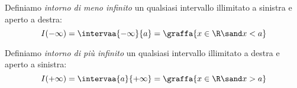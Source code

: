 
\begin{newdef}{}{}
Definiamo \emph{intorno di meno infinito} un qualsiasi intervallo illimitato 
a sinistra e aperto a destra:
\[I(-\infty) = \intervaa{-\infty}{a} = \graffa{x \in \R \sand x < a}\]
\end{newdef}

\begin{center} \intornomenoinf \end{center}



\begin{newdef}{}{}
Definiamo \emph{intorno di più infinito} un qualsiasi intervallo illimitato a 
destra e aperto a sinistra:
\[I(+\infty) = \intervaa{a}{+\infty} = \graffa{x \in \R \sand x > a}\]
\end{newdef}

\begin{center} \intornopiuinf \end{center}


% 


